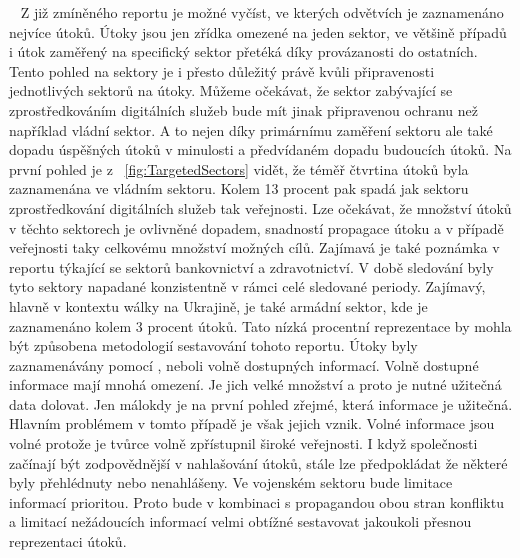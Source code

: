 ~
Z již zmíněného reportu\cite{Enisa_thread_landscape} je možné vyčíst, ve kterých odvětvích je zaznamenáno nejvíce útoků.
Útoky jsou jen zřídka omezené na jeden sektor, ve většině případů i útok zaměřený na specifický sektor přetéká díky provázanosti do ostatních.
Tento pohled na sektory je i přesto důležitý právě kvůli připravenosti jednotlivých sektorů na útoky.
Můžeme očekávat, že sektor zabývající se zprostředkováním digitálních služeb bude mít jinak připravenou ochranu než například vládní sektor.
A to nejen díky primárnímu zaměření sektoru ale také dopadu úspěšných útoků v minulosti a předvídaném dopadu budoucích útoků.
Na první pohled je z ~\ref{fig:TargetedSectors} vidět, že téměř čtvrtina útoků byla zaznamenána ve vládním sektoru.
Kolem 13 procent pak spadá jak sektoru zprostředkování digitálních služeb tak veřejnosti.
Lze očekávat, že množství útoků v těchto sektorech je ovlivněné dopadem, snadností propagace útoku a v případě veřejnosti taky celkovému množství možných cílů.
Zajímavá je také poznámka v reportu týkající se sektorů bankovnictví a zdravotnictví.
V době sledování byly tyto sektory napadané konzistentně v rámci celé sledované periody.
Zajímavý, hlavně v kontextu wálky na Ukrajině, je také armádní sektor, kde je zaznamenáno kolem 3 procent útoků.
Tato nízká procentní reprezentace by mohla být způsobena metodologií sestavování tohoto reportu.
Útoky byly zaznamenávány pomocí , neboli volně dostupných informací\cite{moje_bakalarka}.
Volně dostupné informace mají mnohá omezení.
Je jich velké množství a proto je nutné užitečná data dolovat.
Jen málokdy je na první pohled zřejmé, která informace je užitečná.
Hlavním problémem v tomto případě je však jejich vznik.
Volné informace jsou volné protože je tvůrce volně zpřístupnil široké veřejnosti.
I když společnosti začínají být zodpovědnější v nahlašování útoků, stále lze předpokládat že některé byly přehlédnuty nebo nenahlášeny.
Ve vojenském sektoru bude limitace informací prioritou.
Proto bude v kombinaci s propagandou obou stran konfliktu a limitací nežádoucích informací velmi obtížné sestavovat jakoukoli přesnou reprezentaci útoků.

